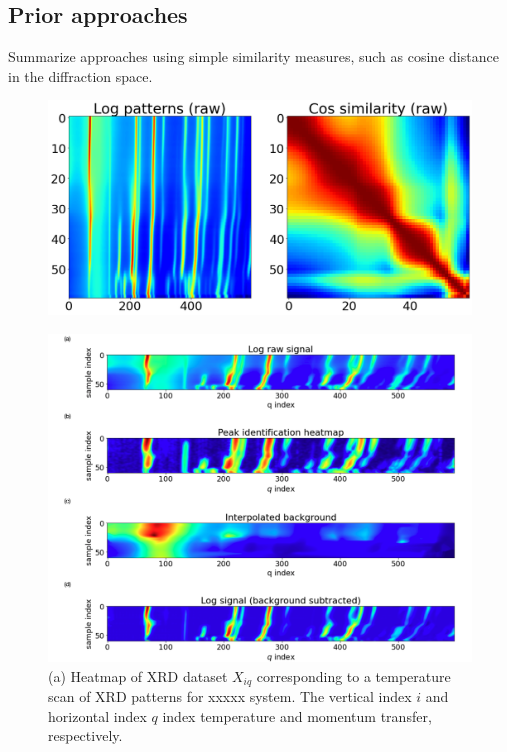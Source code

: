 \documentclass[12pt]{iopart}
\begin{document}
\subsection{Prior approaches}
Summarize approaches using simple similarity measures, such as cosine distance in the diffraction space.

\begin{figure}
  \includegraphics[width=\linewidth]{paper_figures/1/raw_with_similarity.png}
  \caption{}
  \label{fig:noise}
\end{figure}

\begin{figure}
  \includegraphics[width=\linewidth]{figures/heatmaps.png}
  \caption{ (a) Heatmap of XRD dataset $X_{iq}$ corresponding to a temperature scan
of XRD patterns for xxxxx system. The vertical index $i$ and horizontal
index $q$ index temperature and momentum transfer, respectively. }
  \label{fig:heatmaps}
\end{figure}
%
%
\end{document}

